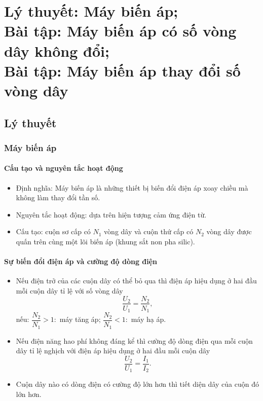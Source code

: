 
\chapter[Lý thuyết: Máy biến áp;\\Bài tập: Máy biến áp có số vòng dây không đổi;\\Bài tập: Máy biến áp thay đổi số vòng dây]{Lý thuyết: Máy biến áp;\\Bài tập: Máy biến áp có số vòng dây không đổi;\\Bài tập: Máy biến áp thay đổi số vòng dây}
\section{Lý thuyết}
\subsection{Máy biến áp}
\subsubsection{Cấu tạo và nguyên tắc hoạt động}
\begin{itemize}
	\item Định nghĩa: Máy biến áp là những thiết bị biến đổi điện áp xoay chiều mà không làm thay đổi tần số.
	\item Nguyên tắc hoạt động: dựa trên hiện tượng cảm ứng điện từ.
	\item Cấu tạo: cuộn sơ cấp có $N_1$ vòng dây và cuộn thứ cấp có $N_2$ vòng dây được quấn trên cùng một lõi biến áp (khung sắt non pha silic).	 
\end{itemize}
\subsubsection{Sự biến đổi điện áp và cường độ dòng điện}
\begin{itemize}
	\item Nếu điện trở của các cuộn dây có thể bỏ qua thì điện áp hiệu dụng ở hai đầu mỗi cuộn dây tỉ lệ với số vòng dây
	\begin{equation*}
		\dfrac{U_2}{U_1}=\dfrac{N_2}{N_1},
	\end{equation*}
	nếu: $\dfrac{N_2}{N_1}>1:$ máy tăng áp; $\dfrac{N_2}{N_1}<1:$ máy hạ áp.
	\item Nếu điện năng hao phí không đáng kể thì cường độ dòng điện qua mỗi cuộn dây tỉ lệ nghịch với điện áp hiệu dụng ở hai đầu mỗi cuộn dây
	\begin{equation*}
		\dfrac{U_2}{U_1}=\dfrac{I_1}{I_2}.
	\end{equation*}
	\item Cuộn dây nào có dòng điện có cường độ lớn hơn thì tiết diện dây của cuộn đó lớn hơn.
	
\end{itemize}

